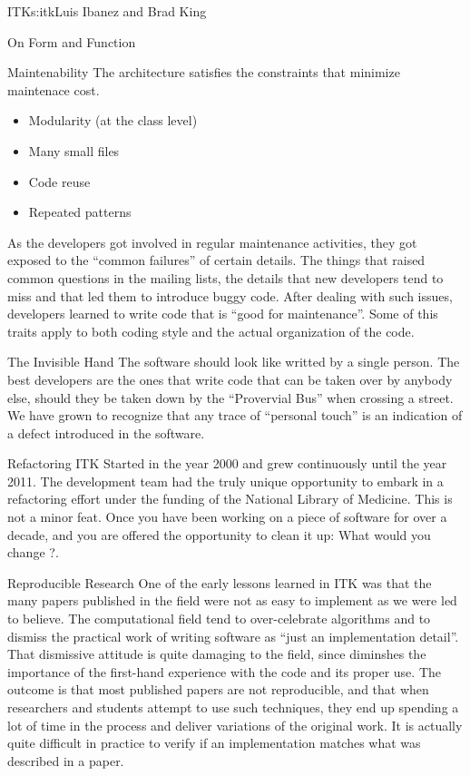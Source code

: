 \begin{aosachapter}{ITK}{s:itk}{Luis Ibanez and Brad King}
\begin{aosasect1}{On Form and Function}
\begin{aosasect2}{Maintenability}
The architecture satisfies the constraints that minimize maintenace cost.
\begin{itemize}
\item Modularity (at the class level)
\item Many small files
\item Code reuse
\item Repeated patterns
\end{itemize}
\end{aosasect2}
As the developers got involved in regular maintenance activities, they
got exposed to the ``common failures'' of certain details. The things
that raised common questions in the mailing lists, the details that
new developers tend to miss and that led them to introduce buggy code.
After dealing with such issues, developers learned to write code that
is ``good for maintenance''. Some of this traits apply to both coding
style and the actual organization of the code.

\begin{aosasect2}{The Invisible Hand}
The software should look like writted by a single person. The best
developers are the ones that write code that can be taken over by
anybody else, should they be taken down by the ``Provervial Bus'' when
crossing a street. We have grown to recognize that any trace of
``personal touch'' is an indication of a defect introduced in the
software.
\end{aosasect2}

\end{aosasect1}

\begin{aosasect1}{Refactoring}
ITK Started in the year 2000 and grew continuously until the year
2011. The development team had the truly unique opportunity to embark
in a refactoring effort under the funding of the National Library of
Medicine. This is not a minor feat. Once you have been working on a
piece of software for over a decade, and you are offered the
opportunity to clean it up: What would you change ?.
\end{aosasect1}

\begin{aosasect1}{Reproducible Research}
One of the early lessons learned in ITK was that the many papers
published in the field were not as easy to implement as we were led to
believe. The computational field tend to over-celebrate algorithms and
to dismiss the practical work of writing software as ``just an
implementation detail''. That dismissive attitude is quite damaging to
the field, since diminshes the importance of the first-hand experience
with the code and its proper use. The outcome is that most published papers
are not reproducible, and that when researchers and students attempt to use
such techniques, they end up spending a lot of time in the process and deliver
variations of the original work. It is actually quite difficult in practice
to verify if an implementation matches what was described in a paper.


\end{aosasect1}
\end{aosachapter}
